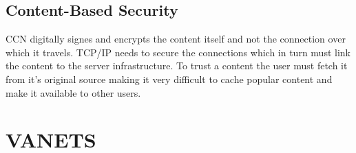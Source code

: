 \subsection{Content-Based Security}

CCN digitally signes and encrypts the content itself and not the connection over which it travels. TCP/IP needs to secure the connections which in turn must link the content to the server infrastructure. To trust a content the user must fetch it from it's original source making it very difficult to cache popular content and make it available to other users.

\section{VANETS}

